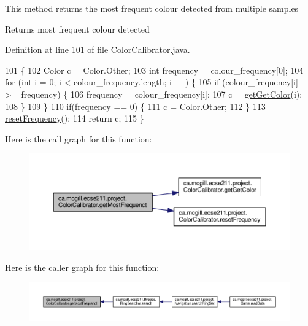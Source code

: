 This method returns the most frequent colour detected from multiple samples

\begin{DoxyReturn}{Returns}
most frequent colour detected 
\end{DoxyReturn}


Definition at line 101 of file Color\+Calibrator.\+java.


\begin{DoxyCode}
101                                          \{
102     Color c = Color.Other;
103     \textcolor{keywordtype}{int} frequency = colour\_frequency[0];
104     \textcolor{keywordflow}{for} (\textcolor{keywordtype}{int} i = 0; i < colour\_frequency.length; i++) \{
105       \textcolor{keywordflow}{if} (colour\_frequency[i] >= frequency) \{
106         frequency = colour\_frequency[i];
107         c = \hyperlink{classca_1_1mcgill_1_1ecse211_1_1project_1_1_color_calibrator_acb1d9cef0739971dbe00cc16712be0fe}{getGetColor}(i);
108       \}
109     \}
110     \textcolor{keywordflow}{if}(frequency == 0) \{
111       c = Color.Other;
112     \}
113     \hyperlink{classca_1_1mcgill_1_1ecse211_1_1project_1_1_color_calibrator_ab6148d75e3a105016580e90ed1ea9bc9}{resetFrequency}();
114     \textcolor{keywordflow}{return} c;
115   \}
\end{DoxyCode}
Here is the call graph for this function\+:
\nopagebreak
\begin{figure}[H]
\begin{center}
\leavevmode
\includegraphics[width=350pt]{classca_1_1mcgill_1_1ecse211_1_1project_1_1_color_calibrator_a3d65927aaa2041f933dbdc19c3d2a412_cgraph}
\end{center}
\end{figure}
Here is the caller graph for this function\+:
\nopagebreak
\begin{figure}[H]
\begin{center}
\leavevmode
\includegraphics[width=350pt]{classca_1_1mcgill_1_1ecse211_1_1project_1_1_color_calibrator_a3d65927aaa2041f933dbdc19c3d2a412_icgraph}
\end{center}
\end{figure}
